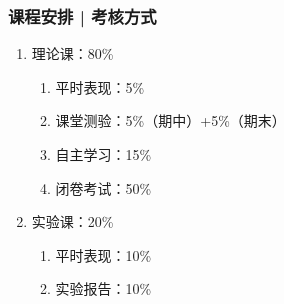 \begin{frame}
  \frametitle{课程安排 | 考核方式}
  \begin{enumerate}
    \item 理论课：80\%
      \begin{enumerate}
        \item 平时表现：5\%
        \item 课堂测验：5\%（期中）+5\%（期末）
        \item 自主学习：15\%
        \item 闭卷考试：50\%
      \end{enumerate}
    \item 实验课：20\%
      \begin{enumerate}
        \item 平时表现：10\%
        \item 实验报告：10\%
      \end{enumerate}
  \end{enumerate}
\end{frame}

